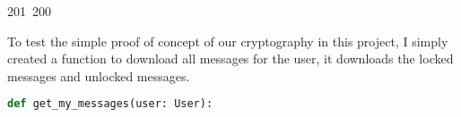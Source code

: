 201~200~\documentclass{article}
\begin{document}
	                                                                                                                                                                                                                                                                                                	                                                                                                                To test the simple proof of concept of our cryptography in this project, I simply created a function to download all messages for the user, it downloads the locked messages and unlocked messages.

	                                                                                                                                                                                                                                                                                                	                                                                                                                \begin{lstlisting}[language=Python, caption=Download messages]
	                                                                                                                                                                                                                                                                                                	                                                                                                                def get_my_messages(user: User):
	                                                                                                                                                                                                                                                                                                	                                                                                                                    """
	                                                                                                                                                                                                                                                                                                	                                                                                                                        \brief Retrieve and download messages for a user.
	                                                                                                                                                                                                                                                                                                	                                                                                                                            \param user The user whose messages are to be retrieved.

\end{lstlisting}
\end{document}
